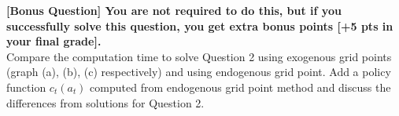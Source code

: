 \documentclass[paper=a4, fontsize=13pt]{extarticle} %
\numberwithin{equation}{section} %
\numberwithin{figure}{section} %
\numberwithin{table}{section} %
\begin{document}
\vspace{0.2in}
\textbf{[Bonus Question] You are not required to do this, but if you successfully solve this question, you get extra bonus points [+5 pts in your final grade].} \\
Compare the computation time to solve Question 2 using exogenous grid points (graph (a), (b), (c) respectively) and using endogenous grid point. Add a policy function $c_t(a_t)$ computed from endogenous grid point method and discuss the differences from solutions for Question 2. \\
\end{document}
